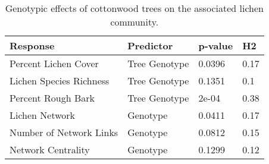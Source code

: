 \begin{table}[ht]
\centering
\begin{tabular}{llll}
  \hline
Response & Predictor & p-value & H2 \\ 
  \hline
Percent Lichen Cover & Tree Genotype & 0.0396 & 0.17 \\ 
  Lichen Species Richness & Tree Genotype & 0.1351 & 0.1 \\ 
  Percent Rough Bark & Tree Genotype & 2e-04 & 0.38 \\ 
  Lichen Network & Genotype & 0.0411 & 0.17 \\ 
  Number of Network Links & Genotype & 0.0812 & 0.15 \\ 
  Network Centrality & Genotype & 0.1299 & 0.12 \\ 
   \hline
\end{tabular}
\caption{Genotypic effects of cottonwood trees on the associated lichen community.} 
\label{tab:h2_table}
\end{table}
